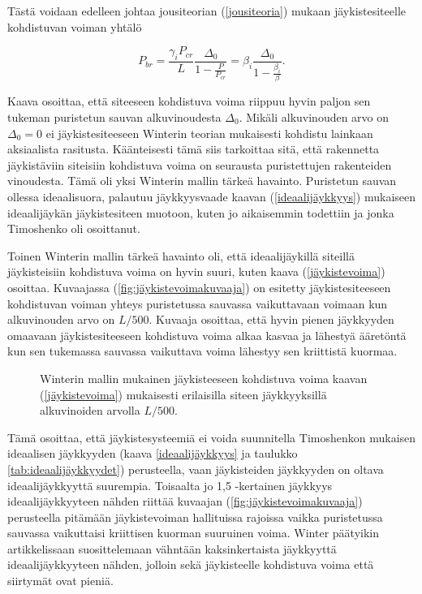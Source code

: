 \documentclass[12pt]{article}
\newenvironment{content}{\pagenumbering{arabic}}{}
\begin{document}
\begin{content}
Tästä voidaan edelleen johtaa jousiteorian (\ref{jousiteoria}) mukaan jäykistesiteelle kohdistuvan voiman yhtälö

\begin{equation}
\label{jäykistevoima}
P_{br} = \frac{\gamma_i P_{cr}}{L} \frac{\Delta_0}{1-\frac{P}{P_{cr}}} = \beta_i \frac{\Delta_0}{1-\frac{\beta_i}{\beta}}.
\end{equation}

Kaava osoittaa, että siteeseen kohdistuva voima riippuu hyvin paljon sen tukeman puristetun sauvan alkuvinoudesta $\Delta_0$. Mikäli alkuvinouden arvo on $\Delta_0 = 0$ ei jäykistesiteeseen Winterin teorian mukaisesti kohdistu lainkaan aksiaalista rasitusta. Käänteisesti tämä siis tarkoittaa sitä, että rakennetta jäykistäviin siteisiin kohdistuva voima on seurausta puristettujen rakenteiden vinoudesta. Tämä oli yksi Winterin mallin tärkeä havainto. Puristetun sauvan ollessa ideaalisuora, palautuu jäykkyysvaade kaavan (\ref{ideaalijäykkyys}) mukaiseen ideaalijäykän jäykistesiteen muotoon, kuten jo aikaisemmin todettiin ja jonka Timoshenko oli osoittanut. 

Toinen Winterin mallin tärkeä havainto oli, että ideaalijäykillä siteillä jäykisteisiin kohdistuva voima on hyvin suuri, kuten kaava (\ref{jäykistevoima}) osoittaa. Kuvaajassa (\ref{fig:jäykistevoimakuvaaja}) on esitetty jäykistesiteeseen kohdistuvan voiman yhteys puristetussa sauvassa vaikuttavaan voimaan kun alkuvinouden arvo on $L/500$. Kuvaaja osoittaa, että hyvin pienen jäykkyyden omaavaan jäykistesiteeseen kohdistuva voima alkaa kasvaa ja lähestyä ääretöntä kun sen tukemassa sauvassa vaikuttava voima lähestyy sen kriittistä kuormaa. 

\begin{figure}[htb]

\caption{Winterin \parencite{winter} mallin mukainen jäykisteeseen kohdistuva voima kaavan (\ref{jäykistevoima}) mukaisesti erilaisilla siteen jäykkyyksillä alkuvinoiden arvolla $L/500$.}
\end{figure}
\label{fig:jäykistevoimakuvaaja}

Tämä osoittaa, että jäykistesysteemiä ei voida suunnitella Timoshenkon mukaisen ideaalisen jäykkyyden (kaava \ref{ideaalijäykkyys} ja taulukko \ref{tab:ideaalijäykkyydet}) perusteella, vaan jäykisteiden jäykkyyden on oltava ideaalijäykkyyttä suurempia. Toisaalta jo 1,5 -kertainen jäykkyys ideaalijäykkyyteen nähden riittää kuvaajan (\ref{fig:jäykistevoimakuvaaja}) perusteella pitämään jäykistevoiman hallituissa rajoissa vaikka puristetussa sauvassa vaikuttaisi kriittisen kuorman suuruinen voima. Winter päätyikin artikkelissaan \parencite{winter} suosittelemaan vähntään kaksinkertaista jäykkyyttä ideaalijäykkyyteen nähden, jolloin sekä jäykisteelle kohdistuva voima että siirtymät ovat pieniä. 



\end{content}
\end{document}
